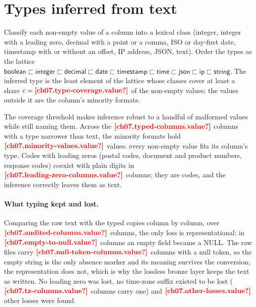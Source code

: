 

\section{Types inferred from text}\label{sec:sf-lexical}

\begin{definition}\label{def:sf-type}
Classify each non-empty value of a column into a lexical class (integer, integer with a leading zero, decimal with a
point or a comma, ISO or day-first date, timestamp with or without an offset, IP address, JSON, text). Order the types
as the lattice
$\mathsf{boolean} \sqsubset \mathsf{integer} \sqsubset \mathsf{decimal} \sqsubset \mathsf{date} \sqsubset
\mathsf{timestamp} \sqsubset \mathsf{time} \sqsubset \mathsf{json} \sqsubset \mathsf{ip} \sqsubset \mathsf{string}$.
The inferred type is the least element of the lattice whose classes cover at least a share
$c = \est{ch07.type-coverage}{value}$ of the non-empty values; the values outside it are the column's minority formats.
\end{definition}

The coverage threshold makes inference robust to a handful of malformed values while still naming them. Across the
$\est{ch07.typed-columns}{value}$ columns with a type narrower than text, the minority formats hold
$\est{ch07.minority-values}{value}$ values: every non-empty value fits its column's type. Codes with leading zeros
(postal codes, document and product numbers, response codes) coexist with plain digits in
$\est{ch07.leading-zero-columns}{value}$ columns; they are codes, and the inference correctly leaves them as text.

\paragraph{What typing kept and lost.} Comparing the raw text with the typed copies column by column, over
$\est{ch07.audited-columns}{value}$ columns, the only loss is representational: in $\est{ch07.empty-to-null}{value}$
columns an empty field became a NULL. The raw files carry $\est{ch07.null-token-columns}{value}$ columns with a null
token, so the empty string is the only absence marker and its meaning survives the conversion; the representation does
not, which is why the lossless bronze layer keeps the text as written. No leading zero was lost, no time-zone suffix
existed to be lost ($\est{ch07.tz-columns}{value}$ columns carry one) and $\est{ch07.other-losses}{value}$ other losses
were found.

